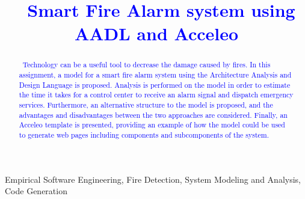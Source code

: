 \documentclass[10pt, conference, compsocconf]{IEEEtran}
\newcommand{\todo}[1]{\textcolor{blue}{\ding{46}~#1}}
\begin{document}
\title{
	\todo{Smart Fire Alarm system using AADL and Acceleo}
}

\author{
\and
{}
}

\maketitle

\begin{abstract}
\todo{Technology can be a useful tool to decrease the damage caused by fires. In this assignment, a model for a smart fire alarm system using the Architecture Analysis and Design Language is proposed. Analysis is performed on the model in order to estimate the time it takes for a control center to receive an alarm signal and dispatch emergency services. Furthermore, an alternative structure to the model is proposed, and the advantages and disadvantages between the two approaches are considered. Finally, an Acceleo template is presented, providing an example of how the model could be used to generate web pages including components and subcomponents of the system.}
\end{abstract}

\begin{IEEEkeywords}
Empirical Software Engineering, Fire Detection, System Modeling and Analysis, Code Generation
\end{IEEEkeywords}





 



\end{document}
